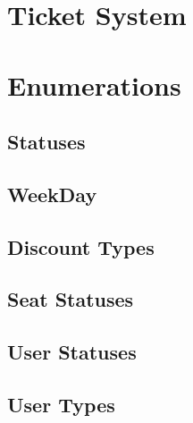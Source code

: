 \section{Ticket System}

\section{Enumerations}
\subsection{Statuses}
\subsection{WeekDay}
\subsection{Discount Types}
\subsection{Seat Statuses}
\subsection{User Statuses}
\subsection{User Types}

